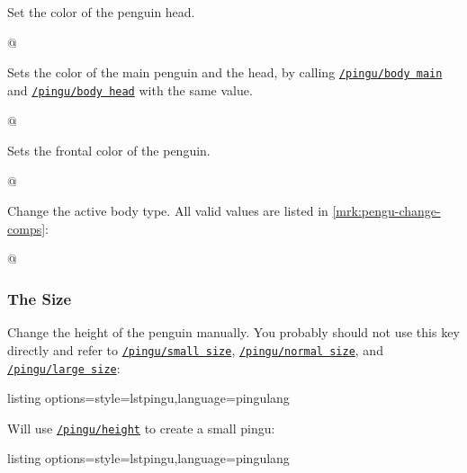 \documentclass[parskip=half,english,numbers=noenddot,footnotes=nomultiple,oneside]{scrartcl}
\def\lpingu#1{\lstinline[style=lstpingu,language=pingulang]'#1'}
\newcommand*\keyref[2][/pingu/]{\hyperref[pk:#1#2]{\lpingu{#1#2}}}
\begin{document}
	Set the color of the penguin head.%
\begin{tcblisting}{@}
\begin{tikzpicture}
	\pingu[body head=green]
\end{tikzpicture}
\end{tcblisting}
\endkeyexplain


	Sets the color of the main penguin and the head, by calling \keyref{body main} and \keyref{body head} with the same value.
\begin{tcblisting}{@}
\begin{tikzpicture}
	\pingu[body=green]
\end{tikzpicture}
\end{tcblisting}
\endkeyexplain


	Sets the frontal color of the penguin.
\begin{tcblisting}{@}
\begin{tikzpicture}
	\pingu[body front=green]
\end{tikzpicture}
\end{tcblisting}
\endkeyexplain


	Change the active body type. All valid values are listed in \autoref{mrk:pengu-change-comps}:
\begin{tcblisting}{@}
\begin{tikzpicture}
	\pingu[body type=legacy]
\end{tikzpicture}
\end{tcblisting}
\endkeyexplain

\subsubsection{The Size}


	Change the height of the penguin manually. You probably should not use this key directly and refer to \keyref{small size}, \keyref{normal size}, and \keyref{large size}:
\begin{tcblisting}{listing options={style=lstpingu,language=pingulang}}
\begin{tikzpicture}
	\pingu[height=17mm]
\end{tikzpicture}
\end{tcblisting}
\endkeyexplain


	Will use \keyref{height} to create a small pingu:
\begin{tcblisting}{listing options={style=lstpingu,language=pingulang}}
\end{tcblisting}
\endkeyexplain
\end{document}
